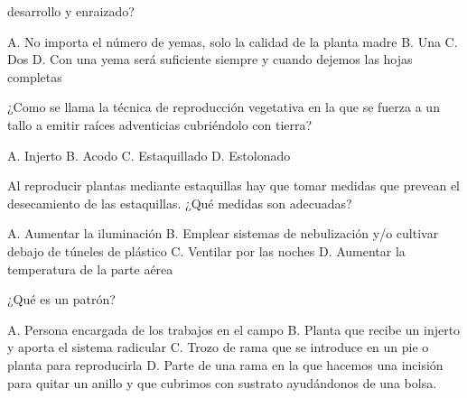 \documentclass[11pt]{exam}
\begin{document}
{\begin{questions}
  desarrollo y enraizado?
  \begin{checkboxes}
    \choice A. No importa el número de yemas, solo la calidad de la planta madre
    \choice B. Una
    \CorrectChoice C. Dos
    \choice D. Con una yema será suficiente siempre y cuando dejemos las hojas completas
  \end{checkboxes}
\question ¿Como se llama la técnica de reproducción vegetativa en la que se
  fuerza a un tallo a emitir raíces adventicias cubriéndolo con tierra?
  \begin{checkboxes}
    \choice A. Injerto
    \CorrectChoice B. Acodo
    \choice C. Estaquillado
    \choice D. Estolonado
  \end{checkboxes}
\question Al reproducir plantas mediante estaquillas hay que tomar medidas que prevean el
  desecamiento de las estaquillas. ¿Qué medidas son adecuadas?
  \begin{checkboxes}
    \choice A. Aumentar la iluminación
    \CorrectChoice B. Emplear sistemas de nebulización y/o cultivar debajo de túneles de
    plástico
    \choice C. Ventilar por las noches
    \choice D. Aumentar la  temperatura de la parte aérea
  \end{checkboxes}
\question ¿Qué es un patrón?
  \begin{checkboxes}
  \choice A. Persona encargada de los trabajos en el campo
  \CorrectChoice  B. Planta que recibe un injerto y aporta el sistema radicular
  \choice C. Trozo de rama que se introduce en un pie o planta para reproducirla
  \choice D. Parte de una rama en la que hacemos una incisión para quitar un
  anillo y que cubrimos con sustrato ayudándonos de una bolsa.
  \end{checkboxes}
\end{questions}}
\end{document}
